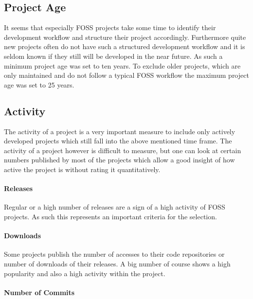 \subsection{Project Age} %

It seems that especially \ac{FOSS} projects take some time to identify their
development workflow and structure their project accordingly. Furthermore quite
new projects often do not have such a structured development workflow and it is
seldom known if they still will be developed in the near future. As such a
minimum project age was set to ten years. To exclude older projects, which are
only maintained and do not follow a typical \ac{FOSS} workflow the maximum
project age was set to 25 years.


\subsection{Activity} %

The activity of a project is a very important measure to include only actively
developed projects which still fall into the above mentioned time frame. The
activity of a project however is difficult to measure, but one can look at
certain numbers published by most of the projects which allow a good insight of
how active the project is without rating it quantitatively.

\paragraph{Releases} %

Regular or a high number of releases are a sign of a high activity of \ac{FOSS}
projects. As such this represents an important criteria for the selection.


\paragraph{Downloads} %

Some projects publish the number of accesses to their code repositories or
number of downloads of their releases. A big number of course shows a high
popularity and also a high activity within the project.


\paragraph{Number of Commits} %

